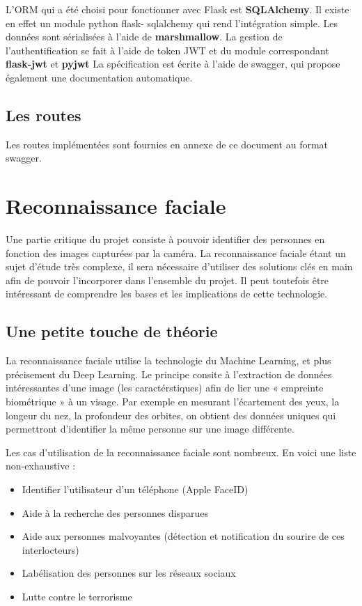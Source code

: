 L’ORM qui a été choisi pour fonctionner avec Flask est \textbf{SQLAlchemy}. Il existe en effet un module python flask-
sqlalchemy qui rend l’intégration simple.
Les données sont sérialisées à l’aide de \textbf{marshmallow}.
La gestion de l’authentification se fait à l’aide de token JWT et du module correspondant \textbf{flask-jwt} et \textbf{pyjwt}
La spécification est écrite à l’aide de swagger, qui propose également une documentation automatique.

\subsection{Les routes}
Les routes implémentées sont fournies en annexe de ce document au format swagger.

\section{Reconnaissance faciale}
Une partie critique du projet consiste à pouvoir identifier des personnes en fonction des images capturées par la
caméra. La reconnaissance faciale étant un sujet d’étude très complexe, il sera nécessaire d’utiliser des solutions
clés en main afin de pouvoir l’incorporer dans l’ensemble du projet. Il peut toutefois être intéressant de
comprendre les bases et les implications de cette technologie.

\subsection{Une petite touche de théorie}
La reconnaissance faciale utilise la technologie du Machine Learning, et plus précisement du Deep Learning.
Le principe consite à l’extraction de données intéressantes d’une image (les caractérstiques) afin de lier une
« empreinte biométrique » à un visage. Par exemple en mesurant l’écartement des yeux, la longeur du nez, la
profondeur des orbites, on obtient des données uniques qui permettront d’identifier la même personne sur une
image différente.

Les cas d’utilisation de la reconnaissance faciale sont nombreux.
En voici une liste non-exhaustive :
\begin{itemize}
\item Identifier l’utilisateur d’un téléphone (Apple FaceID)
\item Aide à la recherche des personnes disparues
\item Aide aux personnes malvoyantes (détection et notification du sourire de ces interlocteurs)
\item Labélisation des personnes sur les réseaux sociaux
\item Lutte contre le terrorisme
\end{itemize}

